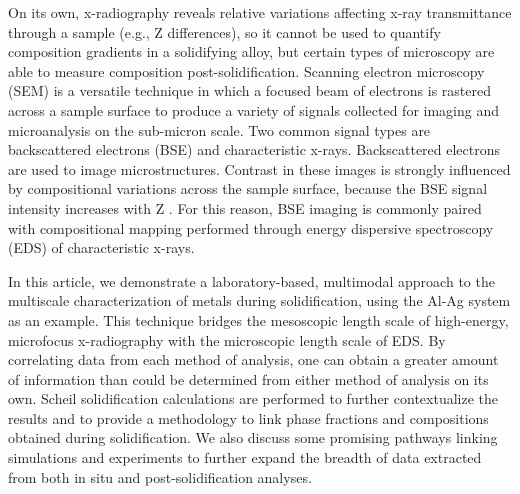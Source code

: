 On its own, x-radiography reveals relative variations affecting x-ray
transmittance through a sample (e.g., Z differences), so it cannot be used
to quantify composition gradients in a solidifying alloy, but certain
types of microscopy are able to measure composition post-solidification.
Scanning electron microscopy (SEM) is a versatile technique in which a
focused beam of electrons is rastered across a sample surface to produce a
variety of signals collected for imaging and microanalysis on the
sub-micron scale. Two common signal types are backscattered electrons
(BSE) and characteristic x-rays. Backscattered electrons are used to image
microstructures. Contrast in these images is strongly influenced by
compositional variations across the sample surface, because the BSE signal
intensity increases with Z \cite{Reuter2003}.
For this reason, BSE imaging is commonly
paired with compositional mapping performed through energy dispersive
spectroscopy (EDS) of characteristic x-rays.

In this article, we demonstrate a laboratory-based, multimodal approach to
the multiscale characterization of metals during solidification, using the
Al-Ag system as an example. This technique bridges the mesoscopic length
scale of high-energy, microfocus x-radiography with the microscopic length
scale of EDS. By correlating data from each method of analysis, one can
obtain a greater amount of information than could be determined from
either method of analysis on its own. Scheil solidification calculations
are performed to further contextualize the results and to provide a
methodology to link phase fractions and compositions obtained during
solidification. We also discuss some promising pathways linking
simulations and experiments to further expand the breadth of data
extracted from both in situ and post-solidification analyses.

